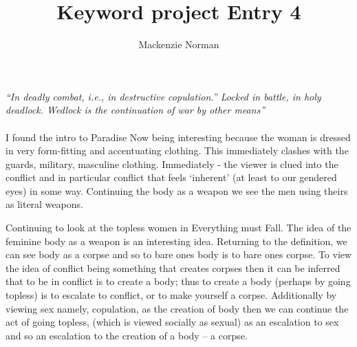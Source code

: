 \documentclass{article}
\title{Keyword project Entry 4}
\author{Mackenzie Norman}
\begin{document}
\textit{``In deadly combat, i.e., in destructive copulation.'' Locked in battle, in holy deadlock. Wedlock is the continuation of war by other means'' }

\paragraph{}

I found the intro to Paradise Now being interesting because the woman is dressed in very form-fitting and accentuating clothing. This immediately clashes with the guards, military, masculine clothing. Immediately - the viewer is clued into the conflict and in particular conflict that feels `inherent' (at least to our gendered eyes) in some way. Continuing the body as a weapon we see the men using theirs as literal weapons.  

Continuing to look at the topless women in Everything must Fall. The idea of the feminine body as a weapon is an interesting idea. Returning to the definition, we can see body as a corpse and so to bare ones body is to bare ones corpse. To view the idea of conflict being something that creates corpses then it can be inferred that to be in conflict is to create a body; thus to create a body (perhaps by going topless) is to escalate to conflict, or to make yourself a corpse. Additionally by viewing sex namely, copulation, as the creation of body then we can continue the act of going topless, (which is viewed socially as sexual) as an escalation to sex and so an escalation to the creation of a body  -- a corpse. 
\end{document}

